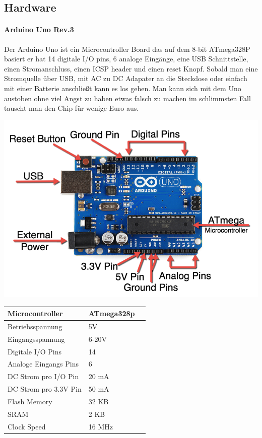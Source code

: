 \documentclass[12pt]{article}
\begin{document}
\subsection{Hardware}
\paragraph{Arduino Uno Rev.3} Der Arduino Uno ist ein Microcontroller Board das auf dem 8-bit ATmega328P basiert er hat 14 digitale I/O pins, 6 analoge Eingänge, eine USB Schnittstelle, einen Stromanschluss, einen ICSP header und einen reset Knopf. Sobald man eine Stromquelle über USB, mit AC zu DC Adapater an die Steckdose  oder einfach mit einer Batterie anschließt kann es los gehen. Man kann sich mit dem Uno austoben ohne viel Angst zu haben etwas falsch zu machen im schlimmsten Fall tauscht man den Chip für wenige Euro aus.

\includegraphics[width=1\textwidth]{images/ArduinoParts.png}
\cite{arduino-front}

\vspace{0.5cm}
\begin{tabularx}{\columnwidth}{XXl}
  Microcontroller&ATmega328p\\
  \hline
  Betriebsspannung&5V\\
  \hline
  Eingangsspannung&6-20V\\
  \hline
  Digitale I/O Pins&14\\
  \hline
  Analoge Eingangs Pins&6\\
  \hline
  DC Strom pro I/O Pin&20 mA\\
  \hline
  DC Strom pro 3.3V Pin&50 mA\\
  \hline
  Flash Memory&32 KB\\
  \hline
  SRAM&2 KB\\
  \hline
  Clock Speed&16 MHz\\
\end{tabularx}
\newpage
\end{document}
